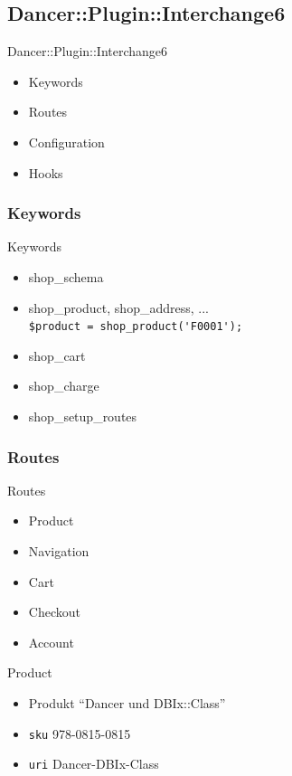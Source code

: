 \subsection{Dancer::Plugin::Interchange6}
\begin{frame}{Dancer::Plugin::Interchange6}
\begin{itemize}
\item Keywords
\item Routes
\item Configuration
\item Hooks
\end{itemize}
\end{frame}

\subsubsection{Keywords}
\begin{frame}[fragile]{Keywords}
\begin{itemize}
\item shop\_schema
\item shop\_product, shop\_address, ...\\
\verb|$product = shop_product('F0001');|
\item shop\_cart
\item shop\_charge
\item shop\_setup\_routes
\end{itemize}
\end{frame}

\subsubsection{Routes}
\begin{frame}{Routes}
\begin{itemize}
\item Product
\item Navigation
\item Cart
\item Checkout
\item Account
\end{itemize}
\end{frame}

\begin{frame}[fragile]{Product}
\begin{itemize}
\item Produkt ``Dancer und DBIx::Class''\\
\item \verb|sku| 978-0815-0815 \\
\item \verb|uri| Dancer-DBIx-Class
\end{itemize}
\end{frame}

